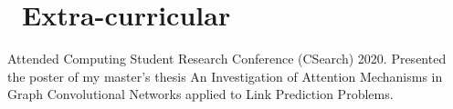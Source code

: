 \documentclass{resume}
\begin{document}
\section{\faInfo\ Extra-curricular}
Attended Computing Student Research Conference (CSearch) 2020. Presented the poster of my master's thesis An Investigation of Attention Mechanisms in Graph Convolutional Networks applied to Link Prediction Problems.
%
%
\end{document}

